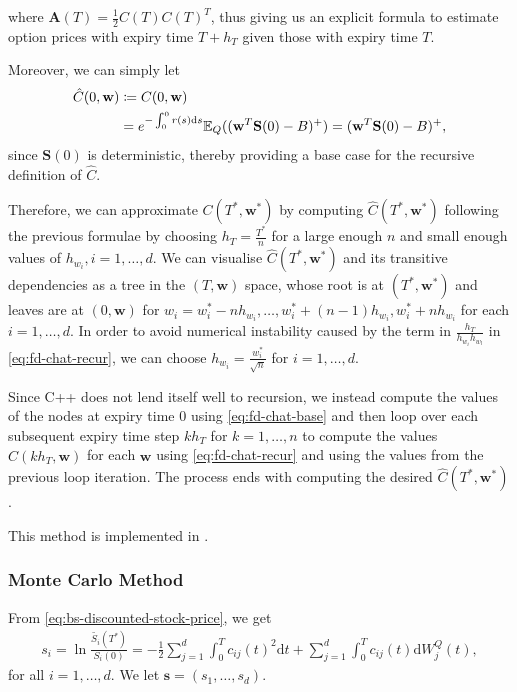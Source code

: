 \documentclass[english]{article}
\numberwithin{equation}{section}
\numberwithin{figure}{section}
\theoremstyle{bolddescit}
\theoremstyle{definition}
\theoremstyle{definition}
\theoremstyle{plain}
\theoremstyle{plain}
\theoremstyle{bolddesc}
\theoremstyle{plain}
\theoremstyle{remark}
\begin{document}
where $\mathbf{A}(T) = \frac{1}{2} C(T) C(T)^T$, thus giving us an explicit formula to estimate option prices with expiry time $T+h_T$ given those with expiry time $T$.

Moreover, we can simply let
\begin{align}
  \hat{C}(0, \mathbf{w})
  &\coloneq C(0, \mathbf{w})\notag\\
  &= e^{-\int_0^0 r(s) \mathrm{d}s} \mathbb{E}_Q((\mathbf{w}^T \mathbf{S}(0) - B)^+)
  = (\mathbf{w}^T \mathbf{S}(0) - B)^+,\label{eq:fd-chat-base}
\end{align}
since $\mathbf{S}(0)$ is deterministic, thereby providing a base case for the recursive definition of $\hat{C}$.

Therefore, we can approximate $C(T^*, \mathbf{w}^*)$ by computing $\hat{C}(T^*, \mathbf{w}^*)$ following the previous formulae by choosing $h_T = \frac{T^*}{n}$ for a large enough $n$ and small enough values of $h_{w_i}, i=1,\ldots,d$. We can visualise $\hat{C}(T^*, \mathbf{w}^*)$ and its transitive dependencies as a tree in the $(T,\mathbf{w})$ space, whose root is at $(T^*, \mathbf{w}^*)$ and leaves are at $(0,\mathbf{w})$ for $w_i = w_i^* - n h_{w_i}, \ldots, w_i^* + (n-1) h_{w_i}, w_i^* + n h_{w_i}$ for each $i=1,\ldots,d$. In order to avoid numerical instability caused by the term in $\frac{h_T}{h_{w_i} h_{w_l}}$ in \eqref{eq:fd-chat-recur}, we can choose $h_{w_i} = \frac{w_i^*}{\sqrt{n}}$ for $i=1,\ldots,d$.

Since C++ does not lend itself well to recursion, we instead compute the values of the nodes at expiry time 0 using \eqref{eq:fd-chat-base} and then loop over each subsequent expiry time step $k h_T$ for $k=1,\ldots,n$ to compute the values $\hat{C}(k h_T, \mathbf{w})$ for each $\mathbf{w}$ using \eqref{eq:fd-chat-recur} and using the values from the previous loop iteration. The process ends with computing the desired $\hat{C}(T^*, \mathbf{w}^*)$.

This method is implemented in .

\subsubsection{Monte Carlo Method}

From \eqref{eq:bs-discounted-stock-price}, we get
\begin{align*}
  s_i = \ln \frac{\widetilde{S_i}(T^*)}{S_i(0)} = - \frac{1}{2} \sum_{j=1}^{d} \int_0^T c_{ij}(t)^2 \mathrm{d}t + \sum_{j=1}^{d} \int_0^T c_{ij}(t) \mathrm{d}W^Q_j(t),
\end{align*}
for all $i=1,\ldots,d$. We let $\mathbf{s} = (s_1,\ldots,s_d)$.
\end{document}

